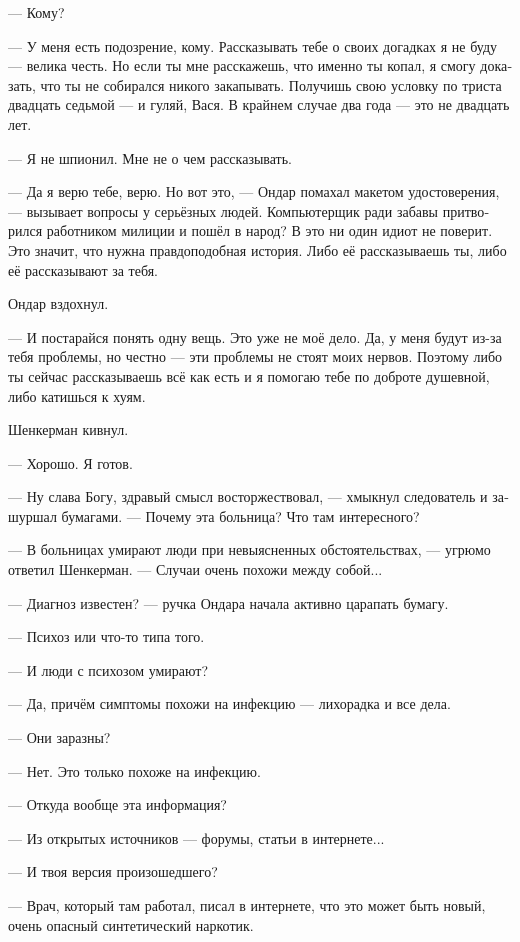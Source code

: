\documentclass[a5paper,12pt,fleqn]{extbook}\usepackage{cooltooltips}\usepackage{polyglossia}\setdefaultlanguage[babelshorthands=true]{russian}\setotherlanguage{english}\defaultfontfeatures{Ligatures=TeX,Mapping=tex-text} \usepackage{xcolor}\definecolor{lightgray}{HTML}{bbbbbb}\color{lightgray}\newcommand{\ml}[3]{\textenglish{\textcolor{black}{#3}}}
\begin{document}
--- Кому?

--- У меня есть подозрение, кому.
Рассказывать тебе о своих догадках я не буду --- велика честь.
Но если ты мне расскажешь, что именно ты копал, я смогу доказать, что ты не собирался никого закапывать.
Получишь свою условку по триста двадцать седьмой --- и гуляй, Вася.
В крайнем случае два года --- это не двадцать лет.

--- Я не шпионил.
Мне не о чем рассказывать.

--- Да я верю тебе, верю.
Но вот это, --- Ондар помахал макетом удостоверения, --- вызывает вопросы у серьёзных людей.
Компьютерщик ради забавы притворился работником милиции и пошёл в народ?
В это ни один идиот не поверит.
Это значит, что нужна правдоподобная история.
Либо её рассказываешь ты, либо её рассказывают за тебя.

Ондар вздохнул.

--- И постарайся понять одну вещь.
Это уже не моё дело.
Да, у меня будут из-за тебя проблемы, но честно --- эти проблемы не стоят моих нервов.
Поэтому либо ты сейчас рассказываешь всё как есть и я помогаю тебе по доброте душевной, либо катишься к хуям.

Шенкерман кивнул.

--- Хорошо.
Я готов.

--- Ну слава Богу, здравый смысл восторжествовал, --- хмыкнул следователь и зашуршал бумагами.
--- Почему эта больница?
Что там интересного?

--- В больницах умирают люди при невыясненных обстоятельствах, --- угрюмо ответил Шенкерман.
--- Случаи очень похожи между собой...

--- Диагноз известен? --- ручка Ондара начала активно царапать бумагу.

--- Психоз или что-то типа того.

--- И люди с психозом умирают?

--- Да, причём симптомы похожи на инфекцию --- лихорадка и все дела.

--- Они заразны?

--- Нет.
Это только похоже на инфекцию.

--- Откуда вообще эта информация?

--- Из открытых источников --- форумы, статьи в интернете...

--- И твоя версия произошедшего?

--- Врач, который там работал, писал в интернете, что это может быть новый, очень опасный синтетический наркотик.
\end{document}

